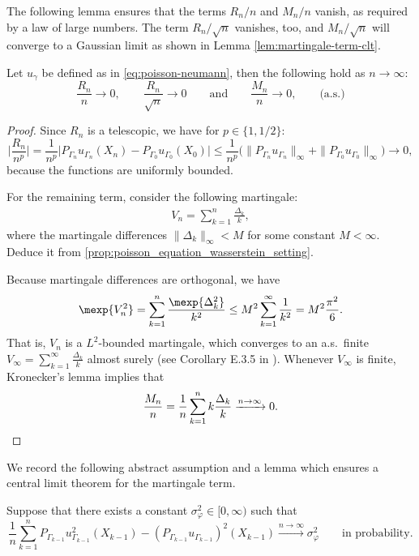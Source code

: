 The following lemma ensures that the terms $R_n/n$ and $M_n/n$ vanish, as required by a law of large numbers. The term $R_n/\sqrt{n}$ vanishes, too, and $M_n/\sqrt{n}$ will converge to a Gaussian limit as shown in Lemma \ref{lem:martingale-term-clt}.

\begin{lemma}
   \label{lem:control-RM}
Let $u_\gamma$ be defined as in \eqref{eq:poisson-neumann}, then the following hold as $n\to\infty$:
\[
\frac{R_n}{n} \to 0, \qquad \frac{R_n}{\sqrt{n}}\to 0 \qquad \text{and}\qquad \frac{M_n}{n} \to 0,\qquad\text{(a.s.)}
\]
\end{lemma}
\begin{proof}
Since $R_n$ is a telescopic, we have for $p\in\{1,1/2\}$:
\[
\bigg|\frac{R_n}{n^p}\bigg|
=\frac{1}{n^p}\big|P_{\Gamma_{n}}u_{\Gamma_{n}}(X_{n})- P_{\Gamma_0}u_{\Gamma_0}(X_0)\big|
\le \frac{1}{n^p} \big( \| P_{\Gamma_{n}}u_{\Gamma_{n}} \|_\infty + \| P_{\Gamma_0}u_{\Gamma_0} \|_\infty \big) \to 0,
\]
because the functions are uniformly bounded.

For the remaining term, consider the following martingale:
\begin{align*}
   V_n=\sum_{k=1}^n\frac{\Delta_k}{k},
\end{align*}
where the martingale differences $\|\Delta_k\|_\infty < M$ for some constant $M<\infty$.
Deduce it from \ref{prop:poisson_equation_wasserstein_setting}.

Because martingale differences are orthogonal, we have
\[
   \mexp{V_n^2}=\sum_{k=1}^n\frac{\mexp{\Delta_k^2}}{k^2} \le M^2 \sum_{k=1}^\infty \frac{1}{k^2} = M^2 \frac{\pi^2}{6}.
\]
That is, $V_n$ is a $L^2$-bounded martingale, which converges to an a.s.~finite $V_\infty = \sum_{k=1}^\infty\frac{\Delta_k}{k}$ almost surely (see Corollary E.3.5 in \cite{douc2018markov}). Whenever $V_\infty$ is finite, Kronecker's lemma implies that 
\begin{equation*}
\frac{M_n}{n}=\frac{1}{n}\sum_{k=1}^n k \frac{\Delta_k}{k}\xrightarrow{n\to\infty} 0.
\qedhere
\end{equation*}
\end{proof}

We record the following abstract assumption and a lemma which ensures a central limit theorem for the martingale term.

\begin{assumption}
   \label{a:limiting-poisson}
Suppose that there exists a constant $\sigma_\varphi^2\in[0,\infty)$ such that
\[
   \frac{1}{n} \sum_{k=1}^n 
   {P_{\Gamma_{k-1}} u_{\Gamma_{k-1}}^2 (X_{k-1}) - (P_{\Gamma_{k-1}} u_{\Gamma_{k-1}})^2(X_{k-1})} 
   \xrightarrow{n\to\infty} \sigma_\varphi^2 \qquad \text{in probability.}
\]
\end{assumption}

